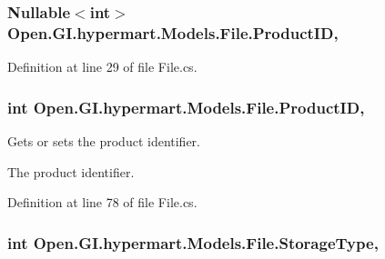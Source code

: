 \subsubsection[{Product\+I\+D}]{\setlength{\rightskip}{0pt plus 5cm}Nullable$<$int$>$ Open.\+G\+I.\+hypermart.\+Models.\+File.\+Product\+I\+D\hspace{0.3cm}{\ttfamily [get]}, {\ttfamily [set]}}\label{class_open_1_1_g_i_1_1hypermart_1_1_models_1_1_file_ad0b974d38df4491ce90d1d5e884a56a8}


Definition at line 29 of file File.\+cs.

\hypertarget{class_open_1_1_g_i_1_1hypermart_1_1_models_1_1_file_a7f0a3da01808662b23635d9b9b6f6848}{}
\subsubsection[{Product\+I\+D}]{\setlength{\rightskip}{0pt plus 5cm}int Open.\+G\+I.\+hypermart.\+Models.\+File.\+Product\+I\+D\hspace{0.3cm}{\ttfamily [get]}, {\ttfamily [set]}}\label{class_open_1_1_g_i_1_1hypermart_1_1_models_1_1_file_a7f0a3da01808662b23635d9b9b6f6848}


Gets or sets the product identifier. 

The product identifier. 

Definition at line 78 of file File.\+cs.

\hypertarget{class_open_1_1_g_i_1_1hypermart_1_1_models_1_1_file_ab4ac8af085696918a7a4e1765639066d}{}
\subsubsection[{Storage\+Type}]{\setlength{\rightskip}{0pt plus 5cm}int Open.\+G\+I.\+hypermart.\+Models.\+File.\+Storage\+Type\hspace{0.3cm}{\ttfamily [get]}, {\ttfamily [set]}}\label{class_open_1_1_g_i_1_1hypermart_1_1_models_1_1_file_ab4ac8af085696918a7a4e1765639066d}


